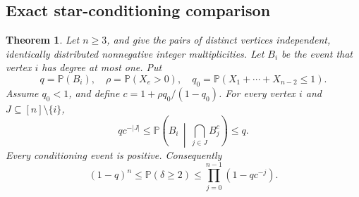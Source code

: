 \documentclass[11pt,letterpaper]{article}
\newtheorem{theorem}{Theorem}[section]
\theoremstyle{remark}\newtheorem{remark}[theorem]{Remark}
\newcommand{\Prob}{\mathbb P}\newcommand{\E}{\mathbb E}
\begin{document}
\subsection{Exact star-conditioning comparison}
\begin{theorem}\label{lfm:thm:star}
Let $n\ge3$, and give the pairs of distinct vertices independent, identically distributed nonnegative integer multiplicities. Let $B_i$ be the event that vertex $i$ has degree at most one. Put
\[
 q=\Prob(B_i),\quad \rho=\Prob(X_e>0),\quad
 q_0=\Prob(X_1+\cdots+X_{n-2}\le1).
\]
Assume $q_0<1$, and define $c=1+\rho q_0/(1-q_0)$. For every vertex $i$ and $J\subseteq[n]\setminus\{i\}$,
\begin{equation}
 q c^{-|J|}\le
 \Prob\left(B_i\,\middle|\,\bigcap_{j\in J}B_j^c\right)\le q.\label{lfm:eq:starconditional}
\end{equation}
Every conditioning event is positive. Consequently
\begin{equation}
 (1-q)^n\le\Prob(\delta\ge2)
 \le\prod_{j=0}^{n-1}(1-qc^{-j}).\label{lfm:eq:starsandwich}
\end{equation}
\end{theorem}
\end{document}
